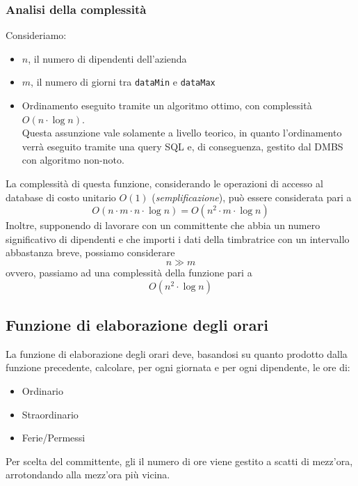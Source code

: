 
\subsubsection{Analisi della complessità}
Consideriamo:
\begin{itemize}
	\item $n$, il numero di dipendenti dell'azienda
	\item $m$, il numero di giorni tra \verb|dataMin| e \verb|dataMax|
	\item Ordinamento eseguito tramite un algoritmo ottimo, con complessità $O(n\cdot \log{n})$.\\
		Questa assunzione vale solamente a livello teorico, in quanto l'ordinamento verrà eseguito tramite una query SQL e, di conseguenza, gestito dal DMBS con algoritmo non-noto.
\end{itemize}
La complessità di questa funzione, considerando le operazioni di accesso al database di costo unitario $O(1)$ (\textit{semplificazione}), può essere considerata pari a
\begin{equation}
	O(n\cdot m \cdot n \cdot \log{n}) = O(n^2 \cdot m \cdot \log{n})
\end{equation}
Inoltre, supponendo di lavorare con un committente che abbia un numero significativo di dipendenti e che importi i dati della timbratrice con un intervallo abbastanza breve, possiamo considerare
\begin{equation}
	n \gg m
\end{equation}
ovvero, passiamo ad una complessità della funzione pari a
\begin{equation}
	O(n^2 \cdot \log{n})
\end{equation}
\subsection{Funzione di elaborazione degli orari}
La funzione di elaborazione degli orari deve, basandosi su quanto prodotto dalla funzione precedente, calcolare, per ogni giornata e per ogni dipendente, le ore di:
\begin{itemize}
	\item Ordinario
	\item Straordinario
	\item Ferie/Permessi
\end{itemize}
Per scelta del committente, gli il numero di ore viene gestito a scatti di mezz'ora, arrotondando alla mezz'ora più vicina.\\


